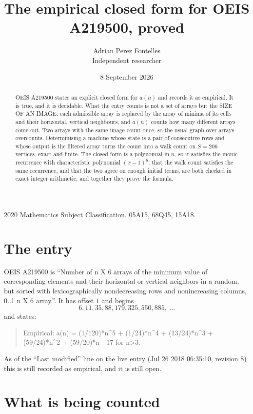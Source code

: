 \documentclass[11pt,a4paper]{article}
\title{The empirical closed form for OEIS A219500, proved}
\author{Adrian Perez Fontelles\\ \small Independent researcher}
\date{8 September 2026}
\theoremstyle{plain}
\theoremstyle{definition}
\begin{document}
\maketitle

\begin{abstract}
OEIS A219500 states an explicit closed form for $a(n)$ and records it as empirical. It is true, and
it is decidable. What the entry counts is not a set of arrays but the SIZE OF AN IMAGE: each
admissible array is replaced by the array of minima of its cells and their horizontal, vertical neighbours,
and $a(n)$ counts how many different arrays come out. Two arrays with the same image count
once, so the usual graph over arrays overcounts. Determinising a machine whose state is a pair
of consecutive rows and whose output is the filtered array turns the count into a walk count on
$S=206$ vertices, exact and finite. The closed form is a polynomial in $n$, so it satisfies the
monic recurrence with characteristic polynomial $(x-1)^{6}$; that the walk count
satisfies the same recurrence, and that the two agree on enough initial terms, are both checked
in exact integer arithmetic, and together they prove the formula.
\end{abstract}

\noindent\small 2020 Mathematics Subject Classification. 05A15, 68Q45, 15A18.\normalsize

\section{The entry}

OEIS A219500 is ``Number of n X 6 arrays of the minimum value of corresponding elements and their horizontal or vertical neighbors in a random, but sorted with lexicographically nondecreasing rows and nonincreasing columns, 0..1 n X 6 array.''. It has offset $1$ and begins
\[
6, 11, 35, 88, 179, 325, 550, 885,\ \dots
\]
and states:
\begin{quote}
Empirical: a(n) = (1/120)*n\^{}5 + (1/24)*n\^{}4 + (13/24)*n\^{}3 + (59/24)*n\^{}2 + (59/20)*n - 17 for n>3.
\end{quote}
As of the ``Last modified'' line on the live entry (Jul 26 2018 06:35:10, revision 8)
this is still recorded as empirical, and it is still open.

\section{What is being counted}
\end{document}
